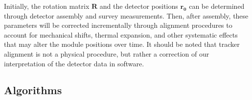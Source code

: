 Initially, the rotation matrix $\mathbf{R}$ and the detector positions $\mathbf{r_0}$ can be determined through detector assembly and survey measurements. Then, after assembly, these parameters will be corrected incrementally through alignment procedures to account for mechanical shifts, thermal expansion, and other systematic effects that may alter the module positions over time. It should be noted that tracker alignment is not a physical procedure, but rather a correction of our interpretation of the detector data in software. 










\subsection{Algorithms}\label{sec:alignalgo}


